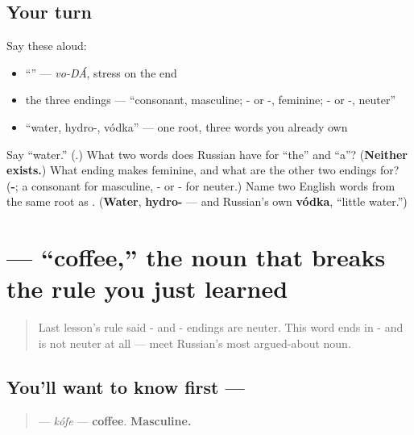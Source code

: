 \subsection*{Your turn}
Say these aloud:

\begin{itemize}
\raggedright
  \item \textquotedblleft{}\textquotedblright{} — \emph{vo-DÁ}, stress on the end
  \item the three endings — \textquotedblleft{}consonant, masculine; - or -, feminine; - or -, neuter\textquotedblright{}
  \item \textquotedblleft{}water, hydro-, vódka\textquotedblright{} — one root, three words you already own
\end{itemize}

\begin{tcolorbox}[breakable,colback=teal!4,colframe=teal!35!black,title={Before you move on}]
Say \textquotedblleft{}water.\textquotedblright{} (\textbf{}.) What two words does Russian have for \textquotedblleft{}the\textquotedblright{} and \textquotedblleft{}a\textquotedblright{}? (\textbf{Neither exists.}) What ending makes \emph{} feminine, and what are the other two endings for? (\textbf{-}; a consonant for masculine, - or - for neuter.) Name two English words from the same root as \emph{}. (\textbf{Water}, \textbf{hydro-} — and Russian's own \textbf{vódka}, \textquotedblleft{}little water.\textquotedblright{})
\end{tcolorbox}
\section[\texorpdfstring{\ru{кофе} (kófe)}{кофе (kófe)}]{ — \textquotedblleft{}coffee,\textquotedblright{} the noun that breaks the rule you just learned}

\label{lesson:RU-C06-kofe}



\begin{quote}
Last lesson's rule said - and - endings are neuter. This word ends in - and is not neuter at all — meet Russian's most argued-about noun.
\end{quote}

\subsection*{You'll want to know first — }
\begin{quote}
\textbf{} — \emph{kófe} — \textbf{coffee}. \textbf{Masculine.}
\end{quote}

